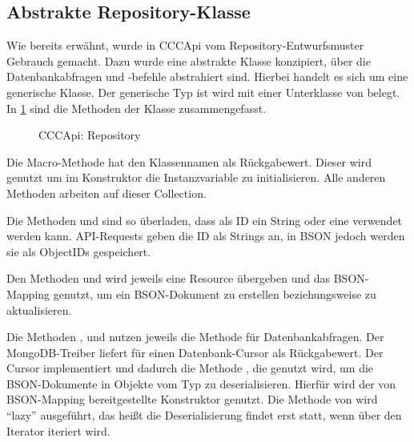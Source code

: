 \subsection{Abstrakte Repository-Klasse}
\label{ssec:ba_abstrakte_repository_klasse}

Wie bereits erwähnt, wurde in CCCApi vom Repository-Entwurfsmuster Gebrauch
gemacht.  Dazu wurde eine abstrakte Klasse  konzipiert, über
die Datenbankabfragen und -befehle abstrahiert sind.  Hierbei handelt es sich
um eine generische Klasse.  Der generische Typ  ist wird mit einer
Unterklasse von  belegt.  In
\cref{fig:cccapi_repository} sind die Methoden der Klasse zusammengefasst.

\begin{figure}
	\centering
	
	\caption{CCCApi: Repository}
	\label{fig:cccapi_repository}
\end{figure}

Die Macro-Methode  hat den Klassennamen als
Rückgabewert.  Dieser wird genutzt um im Konstruktor die Instanzvariable
 zu initialisieren.  Alle anderen Methoden arbeiten auf
dieser Collection.

Die Methoden  und  sind so überladen, dass
als ID ein String oder eine  verwendet werden kann.
API-Requests geben die ID als Strings an, in BSON jedoch werden sie als
ObjectIDs gespeichert.

Den Methoden  und  wird jeweils
eine Resource übergeben und das BSON-Mapping genutzt, um ein BSON-Dokument zu
erstellen beziehungsweise zu aktualisieren.

Die Methoden ,  und  nutzen
jeweils die Methode  für Datenbankabfragen.  Der
MongoDB-Treiber liefert für  einen Datenbank-Cursor
als Rückgabewert.  Der Cursor implementiert  und dadurch die
Methode , die genutzt wird, um die BSON-Dokumente in Objekte
vom Typ  zu deserialisieren.  Hierfür wird der von BSON-Mapping
bereitgestellte Konstruktor  genutzt.  Die Methode
 von  wird \enquote{lazy} ausgeführt, das
heißt die Deserialisierung findet erst statt, wenn über den Iterator iteriert
wird.
